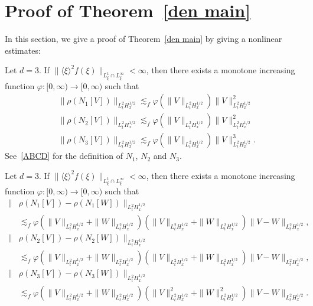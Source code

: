 \documentclass[10pt,a4paper]{amsart}
\newcommand{\ph}{\varphi}
\newcommand{\rh}{\rho}
\newcommand{\K}[1]{\left(#1\right)}
\newcommand{\I}{\infty}
\newcommand{\lxr}{\langle \xi \rangle}
\newcommand{\ls}{\lesssim}
\begin{document}
\section{Proof of Theorem~\ref{den main}}\label{sect5}

In this section, we give a proof of Theorem~\ref{den main} by giving a nonlinear estimates:

\begin{lemm} \label{Lem}
Let $d=3$. If $\|\lxr^2 f(\xi)\|_{L^1_\xi \cap L^\I_\xi} < \I$, then there exists a monotone increasing function $\ph:[0,\I) \to [0,\I)$ such that
\begin{align}
&\| \rh(N_1[V]) \|_{L^2_t H^{1/2}_x}
\ls_f \ph\left(\|V\|_{L^2_t H^{1/2}_x}\right)
\|V\|_{L^2_t H^{1/2}_x}^2 \label{BB}
\\
&\| \rh(N_2[V]) \|_{L^2_t H^{1/2}_x}
\ls_f
\ph\left(\|V\|_{L^2_t H^{1/2}_x}\right)
\|V\|_{L^2_t H^{1/2}_x}^2 \label{CC}
\\
&\| \rh(N_3[V]) \|_{L^2_t H^{1/2}_x}
\ls_f
\ph\left(\|V\|_{L^2_t H^{1/2}_x}\right)
\|V\|_{L^2_t H^{1/2}_x}^3. \label{DD}
\end{align}
See~\eqref{ABCD} for the definition of $N_1$, $N_2$ and $N_3$.
\end{lemm}

\begin{lemm} \label{LemB}
Let $d=3$. If $\|\lxr^2 f(\xi)\|_{L^1_\xi \cap L^\I_\xi} < \I$, then there exists a monotone increasing function $\ph:[0,\I) \to [0,\I)$ such that
\begin{align}
\big\| &\rh(N_1[V]) - \rh(N_1[W]) \big\|_{L^2_t H^{1/2}_x}\label{diff BB} \\
&\ls_f
\ph\left(\|V\|_{L^2_t H^{1/2}_x}+\|W\|_{L^2_t H^{1/2}_x}\right)
\K{\|V\|_{L^2_t H^{1/2}_x} + \|W\|_{L^2_t H^{1/2}_x}}
\|V-W\|_{L^2_t H^{1/2}_x},\nonumber
\\
\big\| &\rh(N_2[V]) - \rh(N_2[W])\big\|_{L^2_t H^{1/2}_x}\label{diff CC} \\
&\ls_f
\ph\left(\|V\|_{L^2_t H^{1/2}_x}+\|W\|_{L^2_t H^{1/2}_x}\right)
\K{\|V\|_{L^2_t H^{1/2}_x}+\|W\|_{L^2_t H^{1/2}_x}}
\|V-W\|_{L^2_t H^{1/2}_x},\nonumber
\\
\big\| &\rh(N_3[V]) - \rh(N_3[W]) \big\|_{L^2_t H^{1/2}_x} \label{diff DD}\\
&\ls_f
\ph\left(\|V\|_{L^2_t H^{1/2}_x}+\|W\|_{L^2_t H^{1/2}_x}\right)
\K{\|V\|_{L^2_t H^{1/2}_x}^2+\|W\|_{L^2_t H^{1/2}_x}^2}
\|V-W\|_{L^2_t H^{1/2}_x}. \nonumber
\end{align}
\end{lemm}
\end{document}
